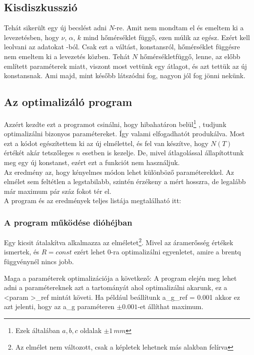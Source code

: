 \documentclass[a4paper, 10pt, oneside]{article}
\begin{document}
\subsection*{Kisdiszkusszió}

Tehát sikerült egy új becslést adni $N$-re. Amit nem mondtam el és emeltem ki a levezetésben, hogy $\nu$, $\alpha$, $k$
mind hőmérséklet függő, ezen múlik az egész. Ezért kell leolvani az adatokat \cite{heat_and_mass}-ból. Csak ezt a 
váltást, konstansról, hőmérséklet függésre nem emeltem ki a levezetés közben. Tehát $N$ hőmérsékletfüggő, lenne, az 
előbb említett paraméterek miatt, viszont most vettünk egy  átlagot, és azt tettük az új konstansnak. Ami majd, 
mint később látszódni fog, nagyon jól fog jönni nekünk.

\subsection{Az optimalizáló program}

Azzért kezdte ezt a programot csinálni, hogy hibahatáron belül\footnote{Ezek általában $a, b, c$ oldalak $\pm 1\, mm$}
, tudjunk optimalizálni bizonyos paramétereket. Így valami elfogadhatót produkálva. Most ezt a kódot egészítettem ki az
új elmélettel, és fel van készítve, hogy $N(T)$ értékét akár tetszőleges $n$ esetben is kezelje. De, mivel 
átlagolással állapítottunk meg egy új konstanst, ezért ezt a funkciót nem használjuk.\\
Az eredmény az, hogy kényelmes módon lehet  különböző paraméterekkel. Az elmélet sem feltétlen a 
legstabilabb, szintén érzékeny a mért hosszra, de legalább már maximum pár száz fokot tér el.\\
A program és az eredmények teljes listája megtalálható itt: \cite{git}

\subsubsection*{A program működése dióhéjban}

Egy kicsit átalakítva alkalmazza az elméletet\footnote{Az elmélet nem változott, csak a képletek lehetnek más 
alakban felírva}. Mivel az áramerősség értékek ismertek, és $R=const$ ezért lehet $0$-ra optimalizálni 
 egyenletet, amire a \textsf{brentq} függvénynél nincs jobb.\smallskip

Maga a paraméterek optimalizációja a következő: A program elején meg lehet adni a paramétereknek azt a tartományát 
ahol optimalizálni akarunk, ez a \textsf{\textless param \textgreater\_ref} mintát követi. Ha például beállítunk
\textsf{a\_g\_ref = 0.001} akkor ez azt jelenti, hogy az \textsf{a\_g} paraméteren $\pm 0.001$-et állíthat maximum.\medskip
\end{document}
